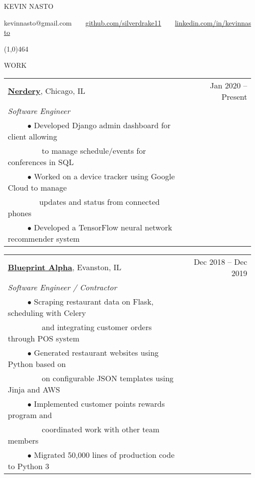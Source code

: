 \documentclass[11pt]{article}
\begin{document}
{\LARGE KEVIN NASTO}

kevin\vphantom{x}nast\vphantom{x}o@g\vphantom{x}mail.com~~\textbullet~~\href{https://github.com/silverdrake11/kevinnasto-cv/blob/master/resume.tex}{github.com/silverdrake11}~~\textbullet~~\href{https://www.linkedin.com/in/kevinnasto}{linkedin.com/in/kevinnasto}

\line(1,0){464}
\vspace{.8cm}


{WORK}

\vspace{0.4cm}

\begin{tabularx}{\linewidth}{l X r}
\textbf{\href{https://nerdery.com/}{Nerdery}}, Chicago, IL & & Jan 2020 -- Present\\
\emph{Software Engineer} \\
~~~~~$\bullet$ Developed Django admin dashboard for client allowing \\
~~~~~~~~ to manage schedule/events for conferences in SQL\\
~~~~~$\bullet$ Worked on a device tracker using Google Cloud to manage\\
~~~~~~~~updates and status from connected phones\\
~~~~~$\bullet$ Developed a TensorFlow neural network recommender system\\

\end{tabularx}


\vspace{0.4cm}

\begin{tabularx}{\linewidth}{l X r}
\textbf{\href{https://blueprintalpha.com/}{Blueprint Alpha}}, Evanston, IL & & Dec 2018 -- Dec 2019 \\
\emph{Software Engineer / Contractor} \\
~~~~~$\bullet$ Scraping restaurant data on Flask, scheduling with Celery\\
~~~~~~~~ and integrating customer orders through POS system\\
~~~~~$\bullet$ Generated restaurant websites using Python based on\\
~~~~~~~~ on configurable JSON templates using Jinja and AWS \\
~~~~~$\bullet$ Implemented customer points rewards program and \\
~~~~~~~~ coordinated work with other team members \\
~~~~~$\bullet$ Migrated 50,000 lines of production code to Python 3 \\

\end{tabularx}
\end{document}
